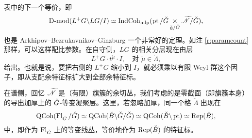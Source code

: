 \ssszh \label{s:abg}表中的下一个等价，即
\[
   \operatorname{D-mod}(L^+G \backslash LG / I) \simeq \operatorname{IndCoh}_{\operatorname{nilp}}(\operatorname{pt}/\check{G} \underset {\check{\mathfrak{g}} / \check{G}}
   \times \widetilde{\mathscr{N}} / \check{G}),
\]
也是 Arkhipov--Bezrukavnikov--Ginzburg \cite{abg} 一个非常好的定理。如注 \ref{r:paramcount} 那样，可以这样配比参数。在自守侧，$LG$ 的相关分层现在由层
\[
     L^+ G \cdot t^{\check{\mu}} \cdot I, \quad \text{对 } \check{\mu} \in
     \check{\Lambda},
\]
给出。也就是说，要把右侧的 $L^+G$ 缩小到 $I$，就必须乘以有限 Weyl 群这个因子，即从支配余特征标扩大到全部余特征标。

在谱侧，回忆 $\widetilde{\mathscr{N}}$ 是（有限）旗簇的余切丛，我们考虑的是零截面（即旗簇本身）的导出加厚上的 $\check{G}$-等变凝聚层。这里，若忽略加厚，同一个格 $\check{\Lambda}$ 出现在
\[
   \operatorname{QCoh}( \operatorname{Fl}_{\check{G}}  / \check{G}  ) \simeq \operatorname{QCoh}(  \check{B} \backslash \check{G} / \check{G}) \simeq
   \operatorname{QCoh}( \check{B} \backslash \operatorname{pt}) \simeq \operatorname{Rep}(\check{B}),
\]
中，即作为 $\operatorname{Fl}_{\check{G}}$ 上的等变线丛，等价地作为 $\operatorname{Rep}(\check{B})$ 的特征标。
